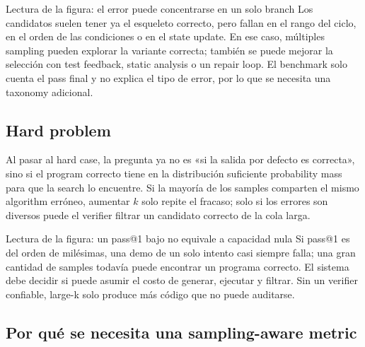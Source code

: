 
\begin{knowledgebox}{Lectura de la figura: el error puede concentrarse en un solo branch}
Los candidatos suelen tener ya el esqueleto correcto, pero fallan en el rango del ciclo, en el orden de las condiciones o en el state update. En ese caso, múltiples sampling pueden explorar la variante correcta; también se puede mejorar la selección con test feedback, static analysis o un repair loop. El benchmark solo cuenta el pass final y no explica el tipo de error, por lo que se necesita una taxonomy adicional.
\end{knowledgebox}

\subsection{Hard problem}

Al pasar al hard case, la pregunta ya no es «si la salida por defecto es correcta», sino si el program correcto tiene en la distribución suficiente probability mass para que la search lo encuentre. Si la mayoría de los samples comparten el mismo algorithm erróneo, aumentar $k$ solo repite el fracaso; solo si los errores son diversos puede el verifier filtrar un candidato correcto de la cola larga.


\begin{knowledgebox}{Lectura de la figura: un pass@1 bajo no equivale a capacidad nula}
Si pass@1 es del orden de milésimas, una demo de un solo intento casi siempre falla; una gran cantidad de samples todavía puede encontrar un programa correcto. El sistema debe decidir si puede asumir el costo de generar, ejecutar y filtrar. Sin un verifier confiable, large-k solo produce más código que no puede auditarse.
\end{knowledgebox}

\subsection{Por qué se necesita una sampling-aware metric}


